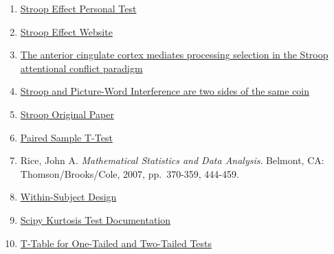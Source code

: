 \documentclass[11pt]{article}
\begin{document}
\begin{enumerate}
\def\labelenumi{\arabic{enumi}.}
\item
  \href{https://faculty.washington.edu/chudler/java/ready.html}{Stroop
  Effect Personal Test}
\item
  \href{https://faculty.washington.edu/chudler/words.html\#seffect}{Stroop
  Effect Website}
\item
  \href{http://www.pnas.org/content/87/1/256.full.pdf}{The anterior
  cingulate cortex mediates processing selection in the Stroop
  attentional conflict paradigm}
\item
  \href{https://link.springer.com/content/pdf/10.3758\%2FPBR.16.6.987.pdf}{Stroop
  and Picture-Word Interference are two sides of the same coin}
\item
  \href{http://psychclassics.yorku.ca/Stroop/}{Stroop Original Paper}
\item
  \href{http://www.statisticssolutions.com/manova-analysis-paired-sample-t-test/}{Paired
  Sample T-Test}
\item
  Rice, John A. \emph{Mathematical Statistics and Data Analysis}.
  Belmont, CA: Thomson/Brooks/Cole, 2007, pp.~370-359, 444-459.
\item
  \href{https://web.mst.edu/~psyworld/within_subjects.htm}{Within-Subject
  Design}
\item
  \href{https://docs.scipy.org/doc/scipy/reference/generated/scipy.stats.kurtosistest.html\#scipy.stats.kurtosistest}{Scipy
  Kurtosis Test Documentation}
\item
  \href{http://www.statisticshowto.com/tables/t-distribution-table/}{T-Table
  for One-Tailed and Two-Tailed Tests}
\end{enumerate}


    
    
    
    
\end{document}

